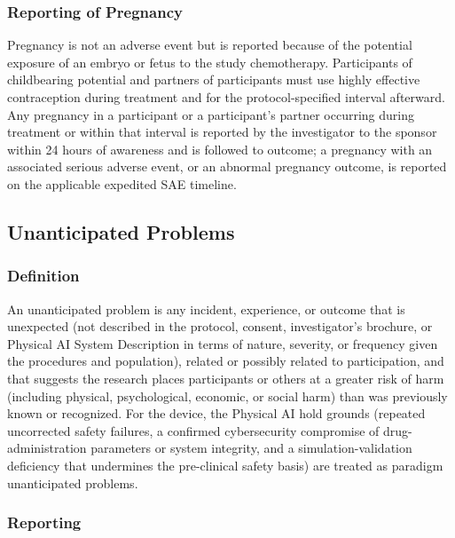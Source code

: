 \subsubsection{Reporting of Pregnancy}

Pregnancy is not an adverse event but is reported because of the potential exposure
of an embryo or fetus to the study chemotherapy. Participants of childbearing
potential and partners of participants must use highly effective contraception during
treatment and for the protocol-specified interval afterward. Any pregnancy in a
participant or a participant's partner occurring during treatment or within that
interval is reported by the investigator to the sponsor within 24 hours of awareness
and is followed to outcome; a pregnancy with an associated serious adverse event, or
an abnormal pregnancy outcome, is reported on the applicable expedited SAE timeline.

\subsection{Unanticipated Problems}

\subsubsection{Definition}

An unanticipated problem is any incident, experience, or outcome that is unexpected
(not described in the protocol, consent, investigator's brochure, or Physical AI
System Description in terms of nature, severity, or frequency given the procedures
and population), related or possibly related to participation, and that suggests the
research places participants or others at a greater risk of harm (including physical,
psychological, economic, or social harm) than was previously known or recognized. For
the device, the Physical AI hold grounds (repeated uncorrected safety failures, a
confirmed cybersecurity compromise of drug-administration parameters or system
integrity, and a simulation-validation deficiency that undermines the pre-clinical
safety basis) are treated as paradigm unanticipated problems.

\subsubsection{Reporting}

